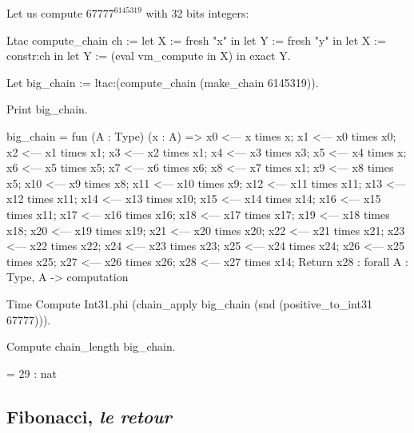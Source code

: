 Let us compute  $67777^{6145319}$ with 32 bits integers:

\begin{Coqsrc}

Ltac compute_chain ch := 
   let X := fresh "x" in 
   let Y := fresh "y" in
   let X := constr:ch in 
   let Y := (eval vm_compute in X) in 
   exact Y.

Let big_chain := ltac:(compute_chain  (make_chain 6145319)).

Print big_chain.
\end{Coqsrc}


\begin{Coqanswer}
big_chain = 
fun (A : Type) (x : A) =>
x0 <--- x times x; x1 <--- x0 times x0;
x2 <--- x1 times x1; x3 <--- x2 times x1;
x4 <--- x3 times x3; x5 <--- x4 times x;
x6 <--- x5 times x5; x7 <--- x6 times x6;
x8 <--- x7 times x1; x9 <--- x8 times x5;
x10 <--- x9 times x8; x11 <--- x10 times x9;
x12 <--- x11 times x11; x13 <--- x12 times x11;
x14 <--- x13 times x10; x15 <--- x14 times x14;
x16 <--- x15 times x11; x17 <--- x16 times x16;
x18 <--- x17 times x17; x19 <--- x18 times x18;
x20 <--- x19 times x19; x21 <--- x20 times x20;
x22 <--- x21 times x21; x23 <--- x22 times x22;
x24 <--- x23 times x23; x25 <--- x24 times x24; 
x26 <--- x25 times x25; x27 <--- x26 times x26; 
x28 <--- x27 times x14;  Return x28
     : forall A : Type, A -> computation

\end{Coqanswer}

\begin{Coqsrc}
Time   Compute  Int31.phi 
     (chain_apply big_chain (snd (positive_to_int31  67777))).
\end{Coqsrc}
\begin{Coqanswer}
= 2014111041%
     : Z
Finished transaction in 0.005 secs (0.005u,0.s) (successful)}  
\end{Coqanswer}

\begin{Coqsrc}
Compute chain_length big_chain.
\end{Coqsrc}

\begin{Coqanswer}
= 29%
     : nat  
\end{Coqanswer}



\subsection{Fibonacci, \emph{le retour}}
\label{sect:fibonacci-euclidean}

